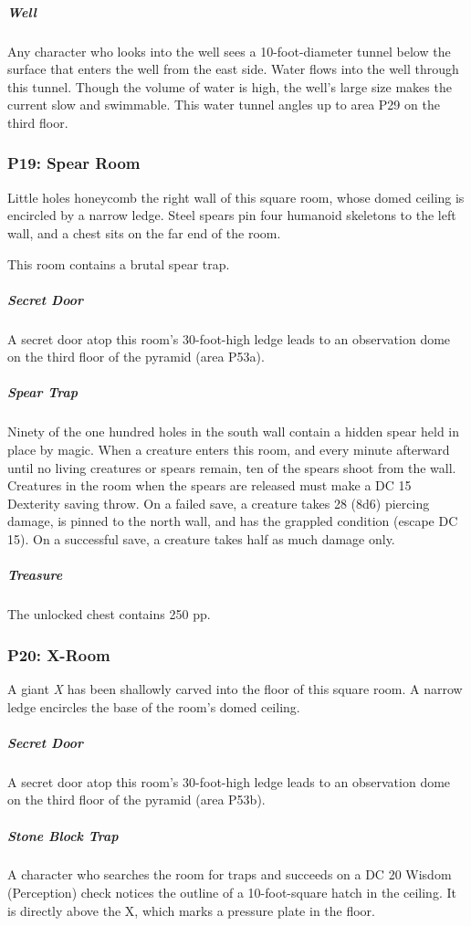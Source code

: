 \documentclass[10pt,a4paper,twoside,bg=print,twocolumn,openany,nodeprecatedcode]{dndbook}
\begin{document}
\subparagraph{Well}
Any character who looks into the well sees a 10-foot-diameter tunnel below the surface that enters the well from the east side. Water flows into the well through this tunnel. Though the volume of water is high, the well's large size makes the current slow and swimmable. This water tunnel angles up to area P29 on the third floor.

\subsubsection{P19: Spear Room}
\begin{DndReadAloud}{}
Little holes honeycomb the right wall of this square room, whose domed ceiling is encircled by a narrow ledge. Steel spears pin four humanoid skeletons to the left wall, and a chest sits on the far end of the room.

\end{DndReadAloud}

This room contains a brutal spear trap.

\subparagraph{Secret Door}
A secret door atop this room's 30-foot-high ledge leads to an observation dome on the third floor of the pyramid (area P53a).

\subparagraph{Spear Trap}
Ninety of the one hundred holes in the south wall contain a hidden spear held in place by magic. When a creature enters this room, and every minute afterward until no living creatures or spears remain, ten of the spears shoot from the wall. Creatures in the room when the spears are released must make a DC 15 Dexterity saving throw. On a failed save, a creature takes 28 (8d6) piercing damage, is pinned to the north wall, and has the grappled condition (escape DC 15). On a successful save, a creature takes half as much damage only.

\subparagraph{Treasure}
The unlocked chest contains 250 pp.

\subsubsection{P20: X-Room}
A giant \textit{X} has been shallowly carved into the floor of this square room. A narrow ledge encircles the base of the room's domed ceiling.

\subparagraph{Secret Door}
A secret door atop this room's 30-foot-high ledge leads to an observation dome on the third floor of the pyramid (area P53b).

\subparagraph{Stone Block Trap}
A character who searches the room for traps and succeeds on a DC 20 Wisdom (Perception) check notices the outline of a 10-foot-square hatch in the ceiling. It is directly above the X, which marks a pressure plate in the floor.
\end{document}
